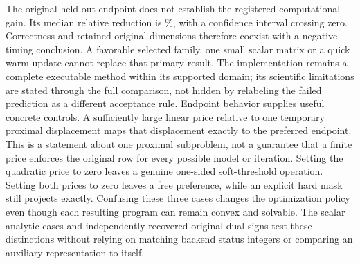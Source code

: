The original held-out endpoint does not establish the registered computational
gain. Its median relative reduction is \OriginalEstimate\%, with a confidence
interval crossing zero. Correctness and retained original dimensions therefore
coexist with a negative timing conclusion. A favorable selected family, one
small scalar matrix or a quick warm update cannot replace that primary result.
The implementation remains a complete executable method within its supported
domain; its scientific limitations are stated through the full comparison,
not hidden by relabeling the failed prediction as a different acceptance rule.
Endpoint behavior supplies useful concrete controls. A sufficiently large
linear price relative to one temporary proximal displacement maps that
displacement exactly to the preferred endpoint. This is a statement about
one proximal subproblem, not a guarantee that a finite price enforces the
original row for every possible model or iteration. Setting the quadratic
price to zero leaves a genuine one-sided soft-threshold operation. Setting
both prices to zero leaves a free preference, while an explicit hard mask
still projects exactly. Confusing these three cases changes the optimization
policy even though each resulting program can remain convex and solvable.
The scalar analytic cases and independently recovered original dual signs
test these distinctions without relying on matching backend status integers
or comparing an auxiliary representation to itself.
